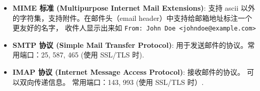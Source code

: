 

\begin{issues}
\issueDraft
\end{issues}

\begin{itemize}
\item \textbf{MIME 标准 (Multipurpose Internet Mail Extensions)}: 支持 ascii 以外的字符集，支持附件。在邮件头（email header）中支持给邮箱地址标注一个更友好的名字， 收件人显示出来如 \verb`From: John Doe <johndoe@example.com>`
\item \textbf{SMTP 协议 (Simple Mail Transfer Protocol)}: 用于发送邮件的协议。常用端口：25, 587, 465 (使用 SSL/TLS 时).
\item \textbf{IMAP 协议 (Internet Message Access Protocol)}: 接收邮件的协议。 可以双向传递信息。 常用端口：143, 993 (使用 SSL/TLS 时）.
\end{itemize}

